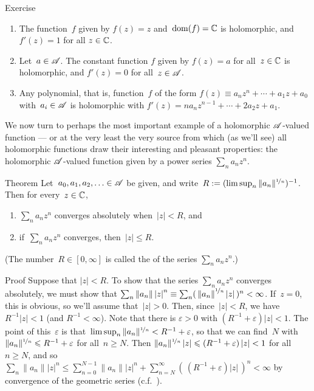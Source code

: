 \documentclass[a]{subfiles}
\begin{document}
\begin{parsec}
\begin{point}{Exercise}
\begin{enumerate}
\item
The function~$f$ given by $f(z)=z$ and~$\dom(f)=\C$
is holomorphic, and $f'(z)=1$ for all $z\in\C$.

\item
Let~$a\in \scrA$. The constant function $f$ given by $f(z)=a$
for all~$z\in \C$ is holomorphic, and $f'(z)=0$ for all~$z\in \scrA$.

\item
Any polynomial,
that is, function~$f$ of the form $f(z)\equiv a_n z^n+\dotsb+a_1 z+a_0$
with~$a_i\in \scrA$
is holomorphic with $f'(z)=na_nz^{n-1}+\dotsb+2a_2z+a_1$.
\end{enumerate}
\end{point}
\end{parsec}

\begin{parsec}%
\begin{point}%
We now turn
to perhaps the most important example
of a holomorphic $\scrA$-valued function ---
or at the very least the very source from
which (as we'll see) all holomorphic functions
draw their interesting and pleasant
properties:
the holomorphic $\scrA$-valued function
given by a power series  $\sum_n a_n z^n$.
\end{point}
\begin{point}[hadamard]{Theorem}%
%
Let~$a_0,a_1,a_2,\dotsc\in\scrA$
be given,
and write~$R:=(\limsup_n \|a_n\|^{\nicefrac{1}{n}})^{-1}$.
Then for every~$z\in\C$,
\begin{enumerate}
\item
$\sum_n a_n z^n$
converges absolutely
when~$\left|z\right| < R$, and 
\item
if~$\sum_n a_n z^n$ converges,
then~$\left|z\right|\leq R$.
\end{enumerate}
(The number~$R\in[0,\infty]$ is called the %
of the series $\sum_n a_n z^n$.)
\begin{point}{Proof}%
Suppose that $\left|z\right|<R$.
To show that the series 
$\sum_n a_nz^n$ converges absolutely,
we must show that $\sum_n \left\|a_n\right\|\left|z\right|^n
\equiv \sum_n (\,\left\|a_n\right\|^{\nicefrac{1}{n}}\left|z\right|\,)^n
<\infty$.
If~$z=0$, this is obvious,
so we'll assume that~$\left|z\right| > 0$.
Then, since~$\left|z\right|<R$,
we have~$R^{-1}\left|z\right|<1$
(and $R^{-1}<\infty$).
Note that
there is $\varepsilon>0$ with $(R^{-1}+\varepsilon)\left|z\right|<1$.
The point of this~$\varepsilon$
is that~$\limsup_n \|a_n\|^{\nicefrac{1}{n}} 
< R^{-1}+\varepsilon$,
so that we can find~$N$ 
with $\|a_n\|^{\nicefrac{1}{n}} \leq R^{-1}+\varepsilon$
for all~$n\geq N$.
Then $\|a_n\|^{\nicefrac{1}{n}}\left|z\right|
\leq (R^{-1}+\varepsilon)\left|z\right|<1$
for all~$n\geq N$,
and so
$\sum_n \|a_n\|\left|z\right|^n 
\leq\sum_{n=0}^{N-1} \|a_n\|\left|z\right|^n+ \sum_{n=N}^\infty 
(\,(R^{-1}+\varepsilon)\left|z\right|\,)^n < \infty$
by  convergence
of the geometric series (c.f.~).


\end{point}
\end{point}
\end{parsec}
\end{document}
